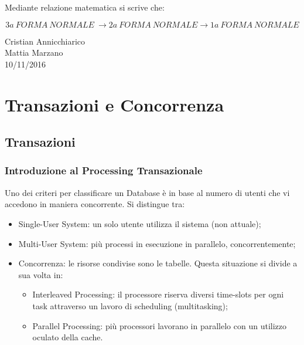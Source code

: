 \begin{itemize}
\end{itemize}

Mediante relazione matematica si scrive che: 

\[
	3a\ FORMA\ NORMALE\ \rightarrow 2a\ FORMA\ NORMALE \rightarrow 1a\ FORMA\ NORMALE
\]


\begin{flushright}Cristian Annicchiarico\\Mattia Marzano\\10/11/2016\end{flushright}


\section{Transazioni e Concorrenza}

\subsection{Transazioni}

\subsubsection{Introduzione al Processing Transazionale} 

Uno dei criteri per classificare un Database è in base al numero di utenti che vi accedono in maniera concorrente. Si distingue tra:

\begin{itemize}

\item{Single-User System}: un solo utente utilizza il sistema (non attuale);
\item{Multi-User System}: più processi in esecuzione in parallelo, concorrentemente;
\item{Concorrenza}: le risorse condivise sono le tabelle. Questa situazione si divide a sua volta in:

\begin{itemize}

\item{Interleaved Processing}: il processore riserva diversi time-slots per ogni task attraverso un lavoro di scheduling (multitasking);
\item{Parallel Processing}: più processori lavorano in parallelo con un utilizzo oculato della cache.

\end{itemize}

\end{itemize}


